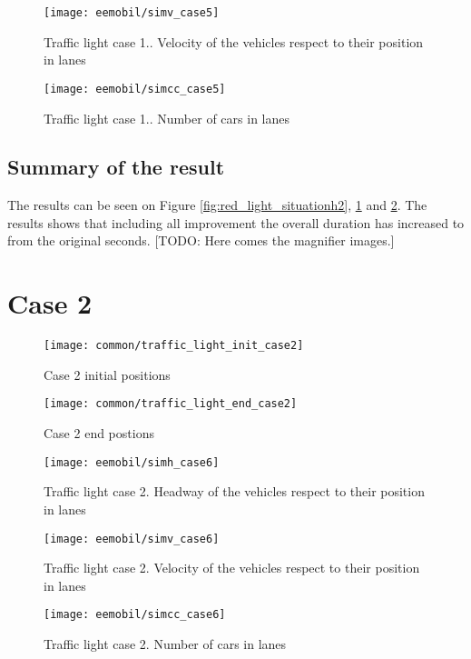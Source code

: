 			\begin{figure}
				\centering
				\texttt{[image: eemobil/simv\_case5]}
				\caption{Traffic light case 1.. Velocity of the vehicles respect to their position in lanes}
				\label{fig:red_light_situationv2}
			\end{figure}
			\begin{figure}
				\centering
				\texttt{[image: eemobil/simcc\_case5]}
				\caption{Traffic light case 1.. Number of cars in lanes }
				\label{fig:red_light_situationcc2}
			\end{figure}
			\subsection*{Summary of the result}
			The results can be seen on Figure \ref{fig:red_light_situationh2}, \ref{fig:red_light_situationv2} and \ref{fig:red_light_situationcc2}. The results shows that including all improvement the overall duration has increased to from the original seconds.
			[TODO: Here comes the magnifier images.]
		\section{Case 2}
			\begin{figure}
				\centering
				\texttt{[image: common/traffic\_light\_init\_case2]}
				\caption{Case 2 initial positions}
				\label{fig:traffic_light_init2}
			\end{figure}
			\begin{figure}
				\centering
				\texttt{[image: common/traffic\_light\_end\_case2]}
				\caption{Case 2 end postions}
				\label{fig:traffic_light_end2}
			\end{figure}
			\begin{figure}
				\centering
				\texttt{[image: eemobil/simh\_case6]}
				\caption{Traffic light case 2. Headway of the vehicles respect to their position in lanes}
				\label{fig:red_light_situationh3}
			\end{figure}
			\begin{figure}
				\centering
				\texttt{[image: eemobil/simv\_case6]}
				\caption{Traffic light case 2. Velocity of the vehicles respect to their position in lanes}
				\label{fig:red_light_situationv3}
			\end{figure}
			\begin{figure}
				\centering
				\texttt{[image: eemobil/simcc\_case6]}
				\caption{Traffic light case 2. Number of cars in lanes }
				\label{fig:red_light_situationcc3}
			\end{figure}